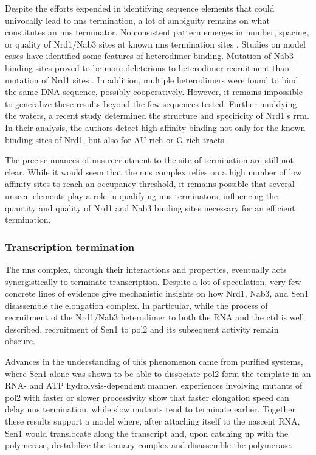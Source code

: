 Despite the efforts expended in identifying sequence elements that could univocally lead to \gls{nns} termination, a lot of ambiguity remains on what constitutes an \gls{nns} terminator.
No consistent pattern emerges in number, spacing, or quality of Nrd1/Nab3 sites at known \gls{nns} termination sites \invivo{}. 
Studies on model cases have identified some features of heterodimer binding. 
Mutation of Nab3 binding sites proved to be more deleterious to heterodimer recruitment than mutation of Nrd1 sites \cite{carroll:2007:interaction}.
In addition, multiple heterodimers were found to bind the same DNA sequence, possibly cooperatively\cite{carroll:2007:interaction}.
However, it remains impossible to generalize these results beyond the few sequences tested.
Further muddying the waters, a recent \invitro{} study determined the structure and specificity of Nrd1's \gls{rrm}.
In their analysis, the authors detect high affinity binding not only for the known binding sites of Nrd1, but also for AU-rich or G-rich tracts \cite{bacikova:2014:structure}.

The precise nuances of \gls{nns} recruitment to the site of termination are still not clear. 
While it would seem that the \gls{nns} complex relies on a high number of low affinity sites to reach an occupancy threshold, it remains possible that several unseen elements play a role in qualifying \gls{nns} terminators, influencing the quantity and quality of Nrd1 and Nab3 binding sites necessary for an efficient termination.


\subsubsection{Transcription termination}

The \gls{nns} complex, through their interactions and properties, eventually acts synergistically to terminate transcription.
Despite a lot of speculation, very few concrete lines of evidence give mechanistic insights on how Nrd1, Nab3, and Sen1 disassemble the elongation complex.
In particular, while the process of recruitment of the Nrd1/Nab3 heterodimer to both the RNA and the \gls{ctd} is well described, recruitment of Sen1 to \gls{pol2} and its subsequent activity remain obscure.

Advances in the understanding of this phenomenon came from \invitro{} purified systems, where Sen1 alone was shown to be able to dissociate \gls{pol2} form the template in an RNA- and ATP hydrolysis-dependent manner. 
\Invivo{} experiences involving mutants of \gls{pol2} with faster or slower processivity show that faster elongation speed can delay \gls{nns} termination, while slow mutants tend to terminate earlier.
Together these results support a model where, after attaching itself to the nascent RNA, Sen1 would translocate along the transcript and, upon catching up with the polymerase, destabilize the ternary complex and disassemble the polymerase.


